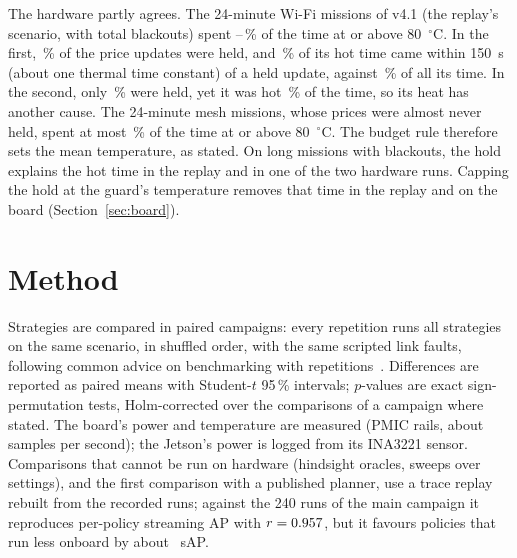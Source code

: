 \documentclass[conference]{IEEEtran}
\begin{document}
The hardware partly agrees. The \HwLongWifiRuns{} 24-minute Wi-Fi missions of v4.1 (the replay's scenario, with
total blackouts) spent \HwLongWifiHotMin--\HwLongWifiHotMax\,\% of the time at or above 80~$^\circ$C. In the first,
\HwLongHeldHi\,\% of the price updates were held, and \HwLongHotAfterHi\,\% of its hot time came within 150~s
(about one thermal time constant) of a held update, against \HwLongAllAfterHi\,\% of all its time. In the second,
only \HwLongHeldLo\,\% were held, yet it was hot \HwLongHotLo\,\% of the time, so its heat has another cause. The
\HwLongMeshRuns{} 24-minute mesh missions, whose prices were almost never held, spent at most
\HwLongMeshHotMax\,\% of the time at or above 80~$^\circ$C. The budget rule therefore sets the mean temperature, as
stated. On long missions with blackouts, the hold explains the hot time in the replay and in one of the two hardware
runs. Capping the hold at the guard's temperature removes that time in the replay and on the board
(Section~\ref{sec:board}).

\section{Method}\label{sec:method}
Strategies are compared in paired campaigns: every repetition runs all strategies on the same scenario, in shuffled
order, with the same scripted link faults, following common advice on benchmarking with repetitions~\cite{Kalibera_2013}. Differences are reported as paired means with Student-$t$ 95\,\%
intervals; $p$-values are exact sign-permutation tests, Holm-corrected over the comparisons of a campaign where
stated. The board's power and temperature are measured (PMIC rails, about \PowerHz{} samples per second); the Jetson's power is logged from its
INA3221 sensor. Comparisons that cannot be run on hardware (hindsight oracles, sweeps over settings), and the first
comparison with a published planner, use a trace replay
rebuilt from the recorded runs; against the 240 runs of the main campaign it reproduces per-policy streaming AP with
$r=0.957{}$, but it favours policies that run less onboard by about \ReplayLeafBias{}~sAP.
\end{document}
